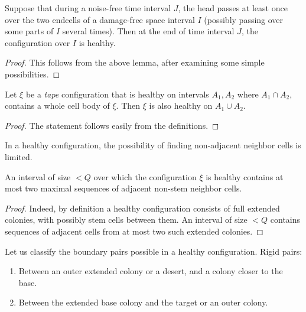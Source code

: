 \documentclass[12pt]{memoir}
\newcommand{\authnote}[3]
{\text{{ \textcolor{#3}{\( \langle\hspace{-0.2em}\langle \)\textsf{\footnotesize #1: #2}\( \rangle\hspace{-0.2em}\rangle \)}}}}
\newcommand{\authnote}[2]{}
\newcommand{\Pnote}[1]{{\authnote{Peter}{#1}{cyan}}}
\begin{document}
  \begin{lemma}\label{lem:coordination2}
    Suppose that during a noise-free time interval \( J \), the head passes at least once over the two
endcells of a damage-free space interval \( I \) (possibly passing over some 
parts of \( I \) several times).
Then at the end of time interval \( J \), the configuration over \( I \) is healthy.
  \end{lemma}
  \begin{proof}
    This follows from the above lemma, after examining some simple possibilities.
\Pnote{Elaborate!}
  \end{proof}

\begin{lemma}\label{lem:health-extension}
  Let \( \xi \) be a \emph{tape} configuration that is healthy on intervals \( A_{1}, A_{2} \) 
where \( A_{1}\cap A_{2} \), contains a whole cell body of \( \xi \).
Then \( \xi \) is also healthy on \( A_{1}\cup A_{2} \).
\end{lemma}
\begin{proof}
  The statement follows easily from the definitions.
\end{proof}

In a healthy configuration, the possibility of finding non-adjacent neighbor
cells is limited.

\begin{lemma}\label{lem:two-domains}
  An interval of size \( <Q \) over which the configuration \( \xi \) is healthy
contains at most two maximal sequences of adjacent non-stem neighbor cells.
\end{lemma}
\begin{proof}
Indeed, by definition a healthy configuration consists of full extended colonies, with 
possibly stem cells between them.
An interval of size \( <Q \) contains sequences of adjacent cells 
from at most two such extended colonies.
\end{proof}

Let us classify the boundary pairs possible in a healthy configuration.
Rigid pairs:

\begin{enumerate}[(r1)]
\item\label{i:rigid.outer-workspace}
  Between an outer extended colony or a desert, and a colony closer to the base.
\item\label{i:rigid.bridge-target} Between the extended base colony 
and the target or an outer colony.
\end{enumerate}
\end{document}
